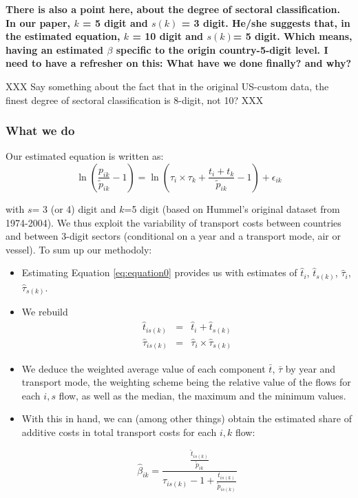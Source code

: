 \documentclass[a4paper,12pt]{article}
\begin{document}
\textbf{There is also a point here, about the degree of sectoral classification. In our paper, $k$ = 5 digit and $s(k)$ = 3 digit. He/she suggests that, in the estimated equation, $k$ = 10 digit and $s(k)$= 5 digit. Which means, having an estimated $\beta$ specific to the origin country-5-digit level. I need to have a refresher on this: What have we done finally? and why?}


XXX Say something about the fact that in the original US-custom data, the finest degree of sectoral classification is 8-digit, not 10? XXX

\subsubsection{What we do}

Our estimated equation is written as:
\begin{equation}
\ln\left(\frac{p_{ik}}{\widetilde{p}_{ik}}-1 \right)= \ln \left(\tau_{i} \times \tau_{k}+\frac{t_{i} + t_{k}}{\widetilde{p}_{ik}}-1 \right) + \epsilon_{ik} \label{eq:equation0}
\end{equation}

\noindent with $s$= 3 (or 4) digit and $k$=5 digit (based on Hummel's original dataset from 1974-2004). We thus exploit the variability of transport costs between countries and between 3-digit sectors (conditional on a year and a transport mode, air or vessel). To sum up our methodoly:
\begin{itemize}
\item Estimating Equation \ref{eq:equation0} provides us with estimates of $\hat{t}_i$, $\hat{t}_{s(k)}$, $\hat{\tau}_i$, $\hat{\tau}_{s(k)}$.
\item We rebuild
\begin{eqnarray*}
\hat{t}_{is(k)} &= &\hat{t}_{i}+\hat{t}_{s(k)} \\
\hat{\tau}_{is(k)} &= & \hat{\tau}_{i}\times\hat{\tau}_{s(k)}
\end{eqnarray*}
\item We deduce the weighted average value of each component $\bar{t}$, $\bar{\tau}$ by year and transport mode, the weighting scheme being the relative value of the flows for each $i,s$ flow, as well as the median, the maximum and the minimum values.
\item With this in hand, we can (among other things) obtain the estimated share of additive costs in total transport costs for each $i,k$ flow:


$$\hat{\beta}_{ik} = \frac{\frac{\hat{t}_{is(k)}}{\tilde{p}_{ik}}}{\tau_{is(k)}-1 + \frac{t_{is(k)}}{\tilde{p}_{is(k)}}} $$
\end{itemize}
\end{document}
